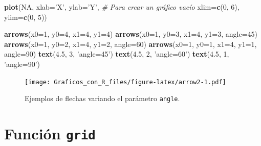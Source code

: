 \documentclass[10pt,]{krantz}
\makeatletter
\newenvironment{Shaded}{\begin{snugshade}}{\end{snugshade}}
\newcommand{\KeywordTok}[1]{\textcolor[rgb]{0.13,0.29,0.53}{\textbf{{#1}}}}
\newcommand{\DataTypeTok}[1]{\textcolor[rgb]{0.13,0.29,0.53}{{#1}}}
\newcommand{\DecValTok}[1]{\textcolor[rgb]{0.00,0.00,0.81}{{#1}}}
\newcommand{\FloatTok}[1]{\textcolor[rgb]{0.00,0.00,0.81}{{#1}}}
\newcommand{\StringTok}[1]{\textcolor[rgb]{0.31,0.60,0.02}{{#1}}}
\newcommand{\CommentTok}[1]{\textcolor[rgb]{0.56,0.35,0.01}{\textit{{#1}}}}
\newcommand{\OtherTok}[1]{\textcolor[rgb]{0.56,0.35,0.01}{{#1}}}
\newcommand{\NormalTok}[1]{{#1}}
\newenvironment{kframe}{%
\medskip{}
\setlength{\fboxsep}{.8em}
 \def\at@end@of@kframe{}%
 \ifinner\ifhmode%
  \def\at@end@of@kframe{\end{minipage}}%
  \begin{minipage}{\columnwidth}%
 \fi\fi%
 \def\FrameCommand##1{\hskip\@totalleftmargin \hskip-\fboxsep
 \colorbox{shadecolor}{##1}\hskip-\fboxsep
     \hskip-\linewidth \hskip-\@totalleftmargin \hskip\columnwidth}%
 \MakeFramed {\advance\hsize-\width
   \@totalleftmargin\z@ \linewidth\hsize
   \@setminipage}}%
 {\par\unskip\endMakeFramed%
 \at@end@of@kframe}
\renewenvironment{Shaded}{\begin{kframe}}{\end{kframe}}
\makeatother
\begin{document}
\begin{Shaded}
\begin{Highlighting}[]
\KeywordTok{plot}\NormalTok{(}\OtherTok{NA}\NormalTok{, }\DataTypeTok{xlab=}\StringTok{'X'}\NormalTok{, }\DataTypeTok{ylab=}\StringTok{'Y'}\NormalTok{,      }\CommentTok{# Para crear un gráfico vacío}
     \DataTypeTok{xlim=}\KeywordTok{c}\NormalTok{(}\DecValTok{0}\NormalTok{, }\DecValTok{6}\NormalTok{), }\DataTypeTok{ylim=}\KeywordTok{c}\NormalTok{(}\DecValTok{0}\NormalTok{, }\DecValTok{5}\NormalTok{))}

\KeywordTok{arrows}\NormalTok{(}\DataTypeTok{x0=}\DecValTok{1}\NormalTok{, }\DataTypeTok{y0=}\DecValTok{4}\NormalTok{, }\DataTypeTok{x1=}\DecValTok{4}\NormalTok{, }\DataTypeTok{y1=}\DecValTok{4}\NormalTok{)}
\KeywordTok{arrows}\NormalTok{(}\DataTypeTok{x0=}\DecValTok{1}\NormalTok{, }\DataTypeTok{y0=}\DecValTok{3}\NormalTok{, }\DataTypeTok{x1=}\DecValTok{4}\NormalTok{, }\DataTypeTok{y1=}\DecValTok{3}\NormalTok{, }\DataTypeTok{angle=}\DecValTok{45}\NormalTok{)}
\KeywordTok{arrows}\NormalTok{(}\DataTypeTok{x0=}\DecValTok{1}\NormalTok{, }\DataTypeTok{y0=}\DecValTok{2}\NormalTok{, }\DataTypeTok{x1=}\DecValTok{4}\NormalTok{, }\DataTypeTok{y1=}\DecValTok{2}\NormalTok{, }\DataTypeTok{angle=}\DecValTok{60}\NormalTok{)}
\KeywordTok{arrows}\NormalTok{(}\DataTypeTok{x0=}\DecValTok{1}\NormalTok{, }\DataTypeTok{y0=}\DecValTok{1}\NormalTok{, }\DataTypeTok{x1=}\DecValTok{4}\NormalTok{, }\DataTypeTok{y1=}\DecValTok{1}\NormalTok{, }\DataTypeTok{angle=}\DecValTok{90}\NormalTok{)}
\KeywordTok{text}\NormalTok{(}\FloatTok{4.5}\NormalTok{, }\DecValTok{3}\NormalTok{, }\StringTok{'angle=45'}\NormalTok{)}
\KeywordTok{text}\NormalTok{(}\FloatTok{4.5}\NormalTok{, }\DecValTok{2}\NormalTok{, }\StringTok{'angle=60'}\NormalTok{)}
\KeywordTok{text}\NormalTok{(}\FloatTok{4.5}\NormalTok{, }\DecValTok{1}\NormalTok{, }\StringTok{'angle=90'}\NormalTok{)}
\end{Highlighting}
\end{Shaded}

\begin{figure}[htbp]
\centering
\texttt{[image: Graficos\_con\_R\_files/figure-latex/arrow2-1.pdf]}
\caption{\label{fig:arrow2}Ejemplos de flechas variando el parámetro
\texttt{angle}.}
\end{figure}

\section{\texorpdfstring{Función \texttt{grid} 
\label{grid}}{Función grid  }}\label{funcion-grid}
\end{document}

